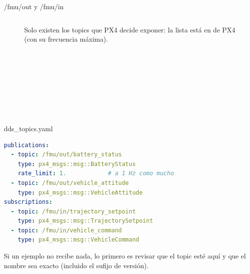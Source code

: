 \begin{frame}{/fmu/out y /fmu/in}
  \begin{columns}[t]
    \begin{idea}[title={\small\bfseries /fmu/out/\ldots: PX4 nos cuenta},coltitle=black,colbacktitle=azulclaro]
      \scriptsize
      \\
      \\
      \\
      \\
      \\
      \\
      \\
      \\
      \\
    \end{idea}
    \begin{idea}[title={\small\bfseries /fmu/in/\ldots: le pedimos a PX4},coltitle=black,colbacktitle=azulclaro]
      \scriptsize
      \\
      \\
    \end{idea}
    \vspace{0.4em}\small
    Solo existen los topics que PX4 decide exponer: la lista está en
     de PX4 (con su frecuencia máxima).
  \end{columns}
\end{frame}

\begin{frame}[fragile]{dds\_topics.yaml}
  \begin{lstlisting}[language=yaml,caption={Un pedazo del archivo de PX4 v1.17}]
publications:
  - topic: /fmu/out/battery_status
    type: px4_msgs::msg::BatteryStatus
    rate_limit: 1.            # a 1 Hz como mucho
  - topic: /fmu/out/vehicle_attitude
    type: px4_msgs::msg::VehicleAttitude
subscriptions:
  - topic: /fmu/in/trajectory_setpoint
    type: px4_msgs::msg::TrajectorySetpoint
  - topic: /fmu/in/vehicle_command
    type: px4_msgs::msg::VehicleCommand
  \end{lstlisting}
  \small Si un ejemplo no recibe nada, lo primero es revisar que el topic esté aquí y que el nombre sea
  exacto (incluido el sufijo de versión).
\end{frame}

